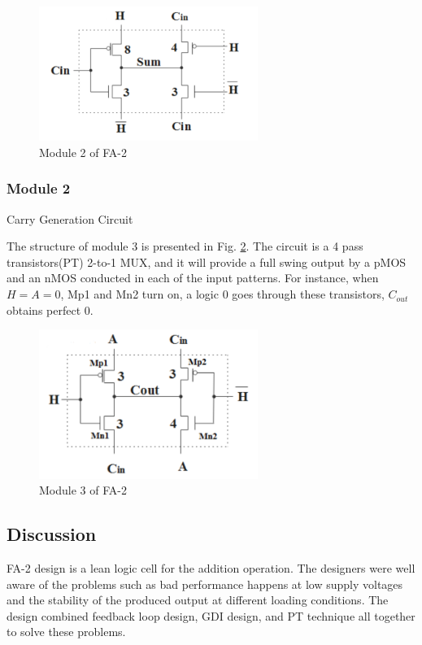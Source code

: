 \documentclass[conference]{IEEEtran}
\begin{document}
\begin{figure}[!hb]
	\centering
	\includegraphics[width=2.8in]{fa2-m2.png}
	\caption{Module 2 of FA-2}
	\label{fig:fa2-m2}
\end{figure}

\subsubsection{Module 2} Carry Generation Circuit

The structure of module 3 is presented in Fig. \ref{fig:fa2-m3}.
The circuit is a 4 pass transistors(PT) 2-to-1 MUX, and it will provide a full swing output by a pMOS and an nMOS conducted in each of the input patterns.
For instance, when \(H = A = 0\), Mp1 and Mn2 turn on, a logic 0 goes through these transistors, \(C_{out}\) obtains perfect 0.

\begin{figure}[!ht]
	\centering
	\includegraphics[width=2.8in]{fa2-m3.png}
	\caption{Module 3 of FA-2}
	\label{fig:fa2-m3}
\end{figure}

\subsection{Discussion}

FA-2 design is a lean logic cell for the addition operation.
The designers were well aware of the problems such as bad performance happens at low supply voltages
and the stability of the produced output at different loading conditions.
The design combined feedback loop design, GDI design, and PT technique all together to solve these problems.
\end{document}
